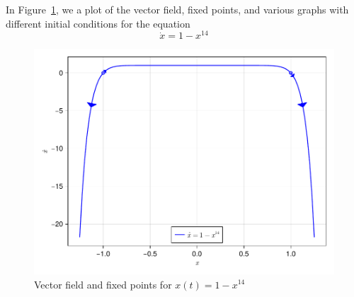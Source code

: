 
In Figure~\ref{fig2_2_2vecfield}, we a plot of the vector field, fixed points,
and various graphs with different initial conditions for the equation 
\[
    \dot{x} = 1 - x^{14}
\]
\begin{figure}[!ht]
    \includegraphics[scale=0.6, center]{../plots/ch02/ex2_2_2.pdf}
    \caption{Vector field and fixed points for $x(t) = 1 - x^{14}$\label{fig2_2_2vecfield}}
\end{figure}
